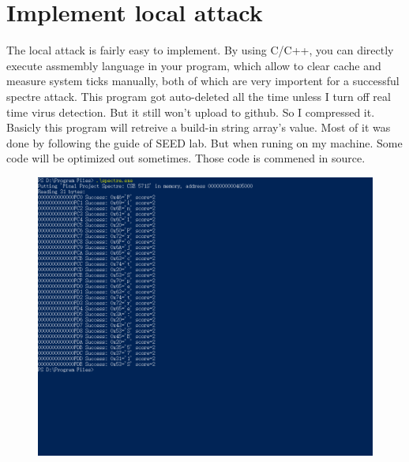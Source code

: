 \documentclass{article}
\begin{document}
\section{Implement local attack}
The local attack is fairly easy to implement. By using C/C++, you can directly execute assmembly language in your program, which allow to clear cache and measure system ticks manually, both of which are very importent for a successful spectre attack.
\newline
\newline
This program got auto-deleted all the time unless I turn off real time virus detection. But it still won't upload to github. So I compressed it. Basicly this program will retreive a build-in string array's value. Most of it was done by following the guide of SEED lab. But when runing on my machine. Some code will be optimized out sometimes. Those code is commened in source.
\begin{figure}[H]\centering\includegraphics[width=\textwidth]{01.png}\end{figure}
\end{document}

